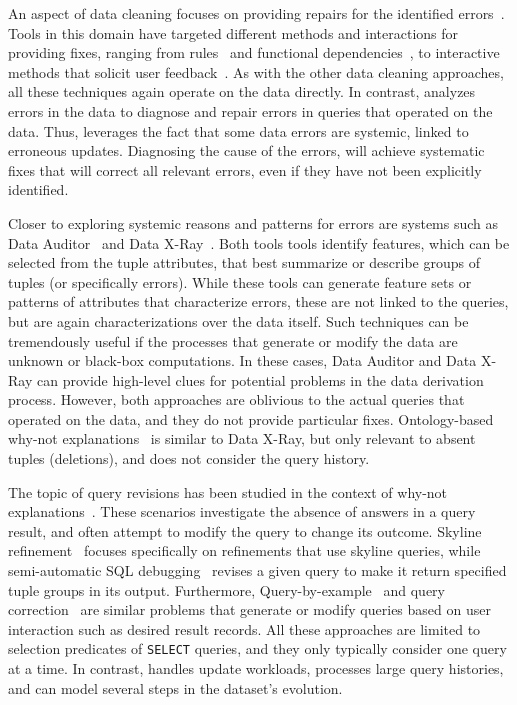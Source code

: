 An aspect of data cleaning focuses on providing repairs for the
identified errors~\cite{ChuIP13}. Tools in this domain have targeted
different methods and interactions for providing fixes, ranging from
rules~\cite{Beskales2010, Cong2007
} and functional
dependencies~\cite{Fan2008b, ChuIP13
}, to interactive methods that
solicit user feedback~\cite{Yakout, Raman01
}. As with the other data
cleaning approaches, all these techniques again operate on the data
directly. In contrast, \sys analyzes errors in the data to diagnose
and repair errors in queries that operated on the data. Thus, \sys
leverages the fact that some data errors are systemic, linked to
erroneous updates. Diagnosing the cause of the errors, will achieve
systematic fixes that will correct all relevant errors, even if they
have not been explicitly identified.

Closer to exploring systemic reasons and patterns for errors are systems such as
 Data Auditor~\cite{GolabKKS10, Golab2008
} and Data X-Ray~\cite{wang2015}. Both tools tools identify features, which can
be selected from the tuple attributes, that best summarize or describe
groups of tuples (or specifically errors). While these tools can
generate feature sets or patterns of attributes that characterize
errors, these are not linked to the queries, but are again
characterizations over the data itself. Such techniques can be
tremendously useful if the processes that generate or modify the data
are unknown or black-box computations. In these cases, Data Auditor
and Data X-Ray can provide high-level clues for potential problems in
the data derivation process. However, both approaches are oblivious to
the actual queries that operated on the data, and they do not provide
particular fixes. Ontology-based why-not
explanations~\cite{tenCate2015} is similar to Data X-Ray, but 
only relevant to absent tuples (deletions), and does not
consider the query history.

The topic of query revisions has been studied in the context of
why-not explanations~\cite{Chapman2009}. These scenarios investigate
the absence of answers in a query result, and often attempt to modify
the query to change its outcome. Skyline
refinement~\cite{tran2010conquer} focuses specifically on refinements
that use skyline queries, while semi-automatic SQL
debugging~\cite{tzompanaki14semi} revises a given query to make it
return specified tuple groups in its output.  Furthermore, Query-by-example~\cite{zloof1977query} 
and query correction~\cite{abouzied2012dataplay} are similar problems that generate or modify
queries based on user interaction such as desired result records.
All these approaches are
limited to selection predicates of \texttt{SELECT} queries, and they
only typically consider one query at a time. In contrast, \sys handles
update workloads, processes large query histories, and can model
several steps in the dataset's evolution. 

